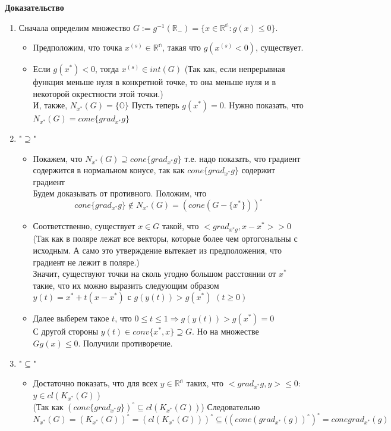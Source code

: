 {\bf Доказательство}
\begin{enumerate}
    \item Сначала определим множество $G:=g^{-1}(\mathbb{R_-})=\{x\in \mathbb{R^n}:g(x)\leq 0\}$.\\

    \begin{itemize}
        \item Предположим, что точка $x^{(s)}\in \mathbb{R^{n}}$, такая что $g(x^{(s)}<0)$, существует.

     \item Если $g(x^*)<0$, тогда $x^{(s)}\in int(G)$ (Так как, если непрерывная функция меньше нуля в конкретной точке, то она меньше нуля и в некоторой окрестности этой точки.)\\
        И, также, $N_{x^{*}}(G)=\{\mathbb{O}\}$
     Пусть теперь $g(x^*)=0$. Нужно показать, что $N_{x^{*}}(G)=cone\{grad_{x^*} g\}$\\
    \end{itemize}
    \item "$\supseteq$"
     \begin{itemize}

     \item Покажем, что $N_{x^{*}}(G)\supseteq cone\{grad_{x^*} g\}$ т.е. надо показать, что градиент содержится в нормальном конусе, так как $cone\{grad_{x^*} g\}$ содержит градиент\\
        Будем доказывать от противного. Положим, что
        $$cone\{grad_{x^*} g\}\notin N_{x^{*}}(G)=(cone (G-\{x^*\}))^\circ $$
        \item Соответственно, существует $x\in G$ такой, что $<grad_{x^* g},x-x^*>>0$
        (Так как в поляре лежат все векторы, которые более чем ортогональны с исходным. А само это утверждение вытекает из предположения, что градиент не лежит в поляре.)\\
        Значит, существуют точки на сколь угодно большом расстоянии от $x^*$ такие, что их можно выразить следующим образом $y(t)=x^*+t(x-x^*)$ с $g(y(t))>g(x^*)$ $(t\geq 0 )$

     \item Далее выберем такое $t$, что $0\leq t\leq 1 \Rightarrow g(y(t))>g(x^*)=0$\\
        С другой стороны $y(t)\in conv\{x^*,x\}\supseteq G$. Но на множестве $G g(x)\leq 0$. Получили противоречие.
        \end{itemize}
        \item "$\subseteq$"
        \begin{itemize}
       \item Достаточно показать, что для всех $y\in \mathbb{R^n}$ таких, что $<grad_{x^*} g,y>\leq 0$: $y\in cl(K_{x^*}(G))$\\
            (Так как $(cone\{grad_{x^*} g\})^\circ \subseteq cl(K_{x^*}(G))$)
        Следовательно $N_{x^*}(G)=(K_{x^*}(G))^\circ=(cl(K_{x^*}(G)))^\circ \subseteq ((cone(grad_{x^*} (g))^\circ)^\circ = cone{grad_{x^*}(g)}$


\end{itemize}
\end{enumerate}
